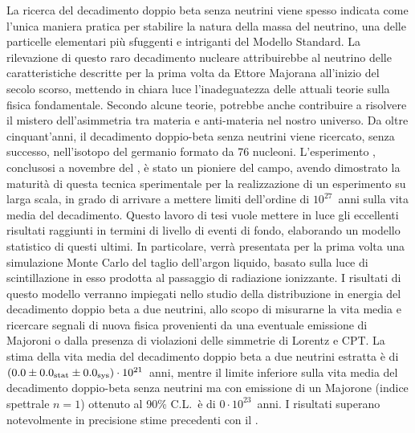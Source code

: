 
La ricerca del decadimento doppio beta senza neutrini viene spesso indicata come
l'unica maniera pratica per stabilire la natura della massa del neutrino, una
delle particelle elementari più sfuggenti e intriganti del Modello Standard. La
rilevazione di questo raro decadimento nucleare attribuirebbe al neutrino delle
caratteristiche descritte per la prima volta da Ettore Majorana all'inizio del
secolo scorso, mettendo in chiara luce l'inadeguatezza delle attuali teorie
sulla fisica fondamentale. Secondo alcune teorie, potrebbe anche contribuire a
risolvere il mistero dell'asimmetria tra materia e anti-materia nel nostro
universo. Da oltre cinquant'anni, il decadimento doppio-beta senza neutrini
viene ricercato, senza successo, nell'isotopo del germanio formato da 76
nucleoni. L'esperimento \gerda, conclusosi a novembre del , è stato un
pioniere del campo, avendo dimostrato la maturità di questa tecnica sperimentale
per la realizzazione di un esperimento su larga scala, in grado di arrivare a
mettere limiti dell'ordine di $10^{27}$~anni sulla vita media del decadimento.
Questo lavoro di tesi vuole mettere in luce gli eccellenti risultati raggiunti
in termini di livello di eventi di fondo, elaborando un modello statistico di
questi ultimi. In particolare, verrà presentata per la prima volta una
simulazione Monte Carlo del taglio dell'argon liquido, basato sulla luce di
scintillazione in esso prodotta al passaggio di radiazione ionizzante. I
risultati di questo modello verranno impiegati nello studio della distribuzione
in energia del decadimento doppio beta a due neutrini, allo scopo di misurarne
la vita media e ricercare segnali di nuova fisica provenienti da una eventuale
emissione di Majoroni o dalla presenza di violazioni delle simmetrie di Lorentz
e CPT. La stima della vita media del decadimento doppio beta a due neutrini
estratta è di $(0.0 \pm {0.0}_\text{stat} \pm {0.0}_\text{sys}) \cdot 10^{21}$~anni, mentre
il limite inferiore sulla vita media del decadimento doppio-beta senza neutrini
ma con emissione di un Majorone (indice spettrale $n=1$) ottenuto al 90\% C.L.~è
di $0 \cdot 10^{23}$~anni. I risultati superano notevolmente in precisione stime
precedenti con il \gesix.

